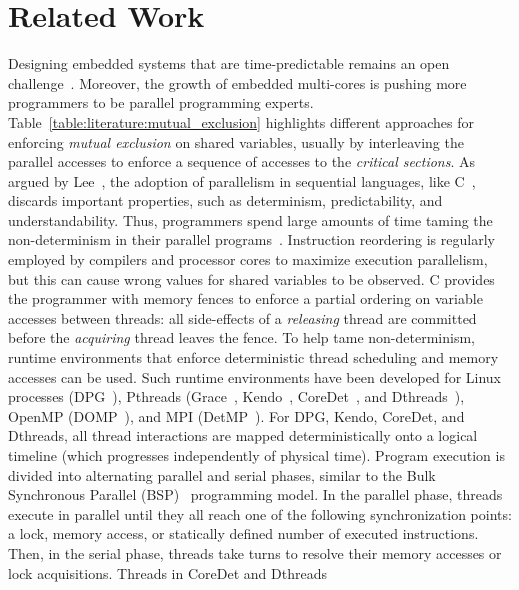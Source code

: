 \section{Related Work}
\label{sec:literature}
Designing embedded systems that are time-predictable remains 
an open challenge~\cite{AxerEFGGGJMRRSHWY14}. Moreover, the 
growth of embedded multi-cores is pushing more
programmers to be parallel programming experts. 
Table~\ref{table:literature:mutual_exclusion} 
highlights different approaches for enforcing \emph{mutual
exclusion} on shared variables, usually by interleaving 
the parallel accesses to enforce a sequence of accesses to 
the \emph{critical sections}.
As argued by Lee~\cite{multiprocessing_problem_threads}, 
the adoption of parallelism in sequential languages, like C~\cite{programming_languages_c11}, 
discards important properties, such as determinism, predictability,
and understandability. Thus, programmers spend large 
amounts of time taming the non-determinism in their parallel 
programs~\cite{multiprocessing_debugging_concurrency_study}. 
Instruction reordering is regularly employed by compilers 
and processor cores to maximize execution parallelism, but this
can cause wrong values for shared variables to be observed.
C provides the programmer with memory fences to enforce a partial 
ordering on variable accesses between threads: all side-effects of 
a \emph{releasing} thread are committed before the \emph{acquiring} 
thread leaves the fence. To help tame non-determinism, runtime environments 
that enforce deterministic thread scheduling and memory
accesses can be used. Such runtime environments have been 
developed for Linux processes (DPG~\cite{multiprocessing_dos}), 
Pthreads (Grace~\cite{multiprocessing_grace}, 
Kendo~\cite{multiprocessing_kendo}, CoreDet~\cite{multiprocessing_coredet}, 
and Dthreads~\cite{multiprocessing_dthreads}), OpenMP 
(DOMP~\cite{multiprocessing_domp}), and 
MPI (DetMP~\cite{multiprocessing_detmp}).
For DPG, Kendo, CoreDet, and Dthreads, all thread interactions
are mapped deterministically onto a logical timeline (which
progresses independently of physical time). Program execution
is divided into alternating parallel and serial phases, similar to
the Bulk Synchronous Parallel (BSP)~\cite{Valiant90} programming model. In 
the parallel phase, threads execute in parallel until they all reach
one of the following synchronization points: a lock, memory access, 
or statically defined number of executed instructions. 
Then, in the serial phase, threads take turns to resolve their memory 
accesses or lock acquisitions. Threads in CoreDet and Dthreads 
